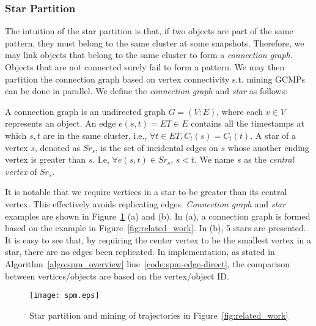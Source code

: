 \subsubsection{Star Partition}
The intuition of the star partition is that, if two objects are part 
of the same pattern, they must belong to the same cluster at 
some snapshots. Therefore, we may link objects that belong to the same cluster to form a \emph{connection graph}. Objects that are
not connected surely fail to form a pattern. We may then
partition the connection graph based on vertex connectivity
s.t. mining GCMPs can be done in parallel. We define the \emph{connection graph} and \emph{star}
as follows:
\begin{definition}
A connection graph is an undirected graph $G=(V:E)$, where 
each $v \in V$ represents an object. An edge $e(s,t)= ET \in E$ 
contains all the timestamps at which $s,t$ are in the same cluster,
i.e., $\forall t \in ET, C_t(s) = C_t(t)$. 
A star of a vertex $s$, denoted as $Sr_s$, is the set of incidental edges on $s$ whose
another ending vertex is greater than $s$. I.e, $\forall e(s,t) \in Sr_s$, $s < t$. We name $s$
as the \emph{central vertex} of $Sr_s$.
\end{definition}

It is notable that we require vertices in a star to be greater than its central vertex. This 
effectively avoids replicating edges. \emph{Connection graph} and \emph{star} examples are 
shown in Figure~\ref{fig:star_partition} (a) and (b). In (a), a connection graph is formed
based on the example in Figure~\ref{fig:related_work}.
In (b), 5 stars are presented. It is easy to see that, by requiring the center vertex to be
the smallest vertex in a star, there are no edges been replicated. In implementation,
as stated in Algorithm~\ref{algo:spm_overview} line~\ref{code:spm-edge-direct}, the
comparison between vertices/objects are based on the vertex/object ID.

\begin{figure}[h]
\centering
\texttt{[image: spm.eps]}
\caption{Star partition and mining of trajectories in Figure~\ref{fig:related_work}}
\label{fig:star_partition}
\end{figure}

